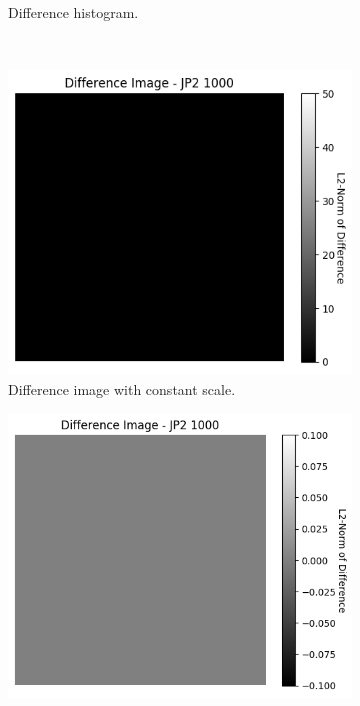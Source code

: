 \begin{figure}[htb]
\begin{subfigure}[b]{0.48\textwidth}
        \caption{Difference histogram.}
        \label{fig:img_quality_comp_jp2_1000_center_histo}
    \end{subfigure}
    \\
    \begin{subfigure}[b]{0.48\textwidth}
        \centering
        \includegraphics[width=\textwidth]{doc/thesis/0_figures/compare_quality/set1/jp2_1000_center_diff_heatmap.png}
        \caption{Difference image with constant scale.}
        \label{fig:img_quality_comp_jp2_1000_center_diff}
    \end{subfigure}
    \begin{subfigure}[b]{0.48\textwidth}
        \centering
        \includegraphics[width=\textwidth]{doc/thesis/0_figures/compare_quality/set1/jp2_1000_center_diff_heatmap_rel.png}

\end{subfigure}
\end{figure}
